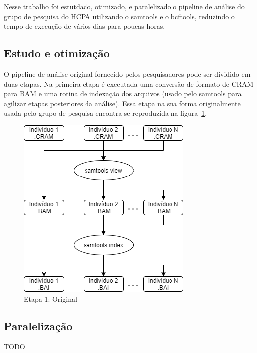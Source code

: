 \documentclass[cic,tc]{iiufrgs}
\begin{document}
Nesse trabalho foi estutdado, otimizado, e paralelizado o pipeline de análise
do grupo de pesquisa do HCPA utilizando o samtools e o bcftools, reduzindo o
tempo de execução de vários dias para poucas horas.

\subsection{Estudo e otimização}

O pipeline de análise original fornecido pelos pesquisadores pode ser dividido
em duas etapas. Na primeira etapa é executada uma conversão de formato de CRAM
para BAM e uma rotina de indexação dos arquivos (usado pelo samtools para
agilizar etapas posteriores da análise). Essa etapa na sua forma originalmente
usada pelo grupo de pesquisa encontra-se reproduzida na figura~\ref{fig:stage1_orig}.

\begin{figure}
  \caption{Etapa 1: Original}
    \begin{center}
      \includegraphics[width=0.5\linewidth]{img/stage1_orig.png}
    \end{center}
    \label{fig:stage1_orig}
\end{figure}


\subsection{Paralelização}

TODO
\end{document}
